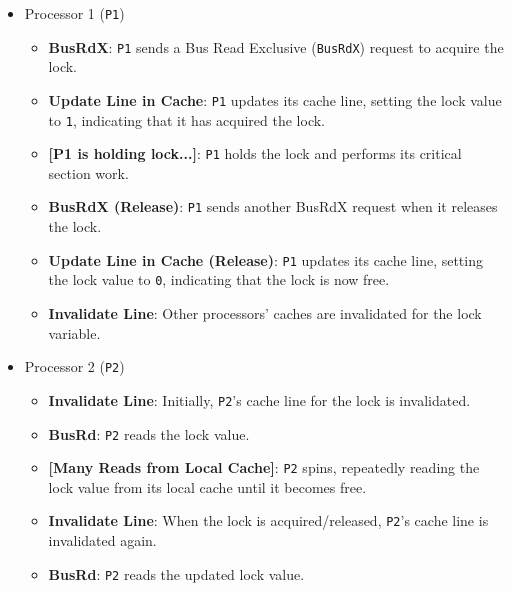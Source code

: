 \begin{itemize}
    \item Processor 1 (\texttt{P1})
    \begin{itemize}
        \item \textbf{BusRdX}: \texttt{P1} sends a Bus Read Exclusive (\texttt{BusRdX}) request to acquire the lock.
        \item \textbf{Update Line in Cache}: \texttt{P1} updates its cache line, setting the lock value to \texttt{1}, indicating that it has acquired the lock.
        \item \textbf{[P1 is holding lock...]}: \texttt{P1} holds the lock and performs its critical section work.
        \item \textbf{BusRdX (Release)}: \texttt{P1} sends another BusRdX request when it releases the lock.
        \item \textbf{Update Line in Cache (Release)}: \texttt{P1} updates its cache line, setting the lock value to \texttt{0}, indicating that the lock is now free.
        \item \textbf{Invalidate Line}: Other processors' caches are invalidated for the lock variable.
    \end{itemize}

    \item Processor 2 (\texttt{P2})
    \begin{itemize}
        \item \textbf{Invalidate Line}: Initially, \texttt{P2}'s cache line for the lock is invalidated.
        \item \textbf{BusRd}: \texttt{P2} reads the lock value.
        \item \textbf{[Many Reads from Local Cache]}: \texttt{P2} spins, repeatedly reading the lock value from its local cache until it becomes free.
        \item \textbf{Invalidate Line}: When the lock is acquired/released, \texttt{P2}'s cache line is invalidated again.
        \item \textbf{BusRd}: \texttt{P2} reads the updated lock value.
    \end{itemize}


\end{itemize}
